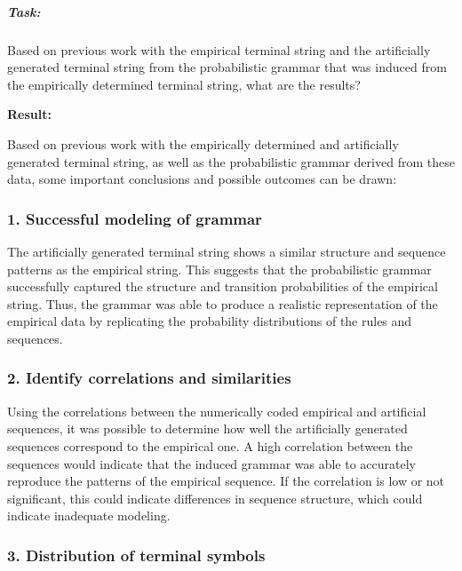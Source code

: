 \documentclass[
]{article}
\begin{document}
\subparagraph{\texorpdfstring{ \textbf{Task:}}{ Task:}}\label{task-1}

Based on previous work with the empirical terminal string and the
artificially generated terminal string from the probabilistic grammar
that was induced from the empirically determined terminal string, what
are the results?

\textbf{Result:}

Based on previous work with the empirically determined and artificially
generated terminal string, as well as the probabilistic grammar derived
from these data, some important conclusions and possible outcomes can be
drawn:

\subsubsection{\texorpdfstring{\textbf{1. Successful modeling of
grammar}}{1. Successful modeling of grammar}}\label{successful-modeling-of-grammar}

The artificially generated terminal string shows a similar structure and
sequence patterns as the empirical string. This suggests that the
probabilistic grammar successfully captured the structure and transition
probabilities of the empirical string. Thus, the grammar was able to
produce a realistic representation of the empirical data by replicating
the probability distributions of the rules and sequences.

\subsubsection{\texorpdfstring{\textbf{2. Identify correlations and
similarities}}{2. Identify correlations and similarities}}\label{identify-correlations-and-similarities}

Using the correlations between the numerically coded empirical and
artificial sequences, it was possible to determine how well the
artificially generated sequences correspond to the empirical one. A high
correlation between the sequences would indicate that the induced
grammar was able to accurately reproduce the patterns of the empirical
sequence. If the correlation is low or not significant, this could
indicate differences in sequence structure, which could indicate
inadequate modeling.

\subsubsection{\texorpdfstring{\textbf{3. Distribution of terminal
symbols}}{3. Distribution of terminal symbols}}\label{distribution-of-terminal-symbols}
\end{document}
